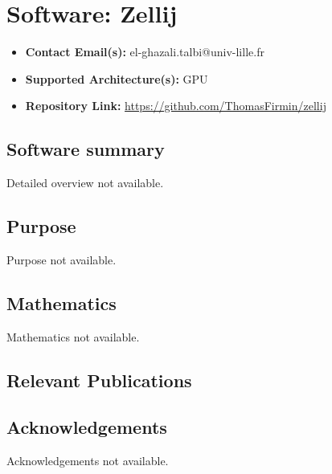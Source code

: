 \section{Software: Zellij}
\label{sec:Zellij:software}



\begin{itemize}
    \item \textbf{Contact Email(s):} el-ghazali.talbi@univ-lille.fr
    \item \textbf{Supported Architecture(s):} GPU
    \item \textbf{Repository Link:} \href{https://github.com/ThomasFirmin/zellij}{https://github.com/ThomasFirmin/zellij}
\end{itemize}

\subsection{Software summary}
\label{sec:Zellij:summary}
Detailed overview not available.



\subsection{Purpose}
\label{sec:Zellij:purpose}
Purpose not available.



\subsection{Mathematics}
\label{sec:Zellij:mathematics}
Mathematics not available.


\subsection{Relevant Publications}
\label{sec:Zellij:publications}

\subsection{Acknowledgements}
\label{sec::Zellij:acknowledgements}

Acknowledgements not available.


